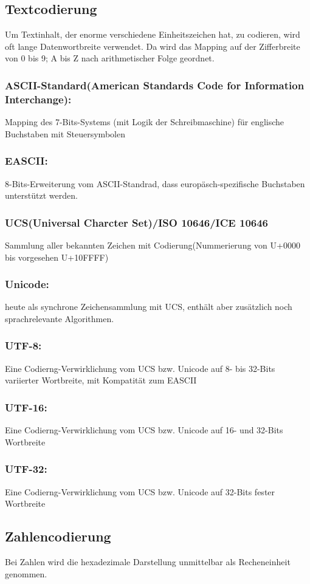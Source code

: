 \documentclass{article}
\begin{document}
    \subsection{Textcodierung}
    Um Textinhalt, der enorme verschiedene Einheitszeichen hat, zu codieren, wird oft lange Datenwortbreite verwendet. Da wird das Mapping auf der Zifferbreite von 0 bis 9; A bis Z nach arithmetischer Folge geordnet.
    \subsubsection*{ASCII-Standard(American Standards Code for Information Interchange):}
    Mapping des 7-Bits-Systems (mit Logik der Schreibmaschine) für englische Buchstaben mit Steuersymbolen
    \subsubsection*{EASCII:}
    8-Bits-Erweiterung vom ASCII-Standrad, dass europäsch-spezifische Buchstaben unterstützt werden.
    \subsubsection*{UCS(Universal Charcter Set)/ISO 10646/ICE 10646}
    Sammlung aller bekannten Zeichen mit Codierung(Nummerierung von U+0000 bis vorgesehen U+10FFFF)
    \subsubsection*{Unicode:}
    heute als synchrone Zeichensammlung mit UCS, enthält aber zusätzlich noch sprachrelevante Algorithmen.
    \subsubsection*{UTF-8:}
    Eine Codierng-Verwirklichung vom UCS bzw. Unicode auf 8- bis 32-Bits variierter Wortbreite, mit Kompatität zum EASCII
    \subsubsection*{UTF-16:}
    Eine Codierng-Verwirklichung vom UCS bzw. Unicode auf 16- und 32-Bits Wortbreite
    \subsubsection*{UTF-32:}
    Eine Codierng-Verwirklichung vom UCS bzw. Unicode auf 32-Bits fester Wortbreite
    \subsection{Zahlencodierung}
    Bei Zahlen wird die hexadezimale Darstellung unmittelbar als Recheneinheit genommen.\\\\
\end{document}
